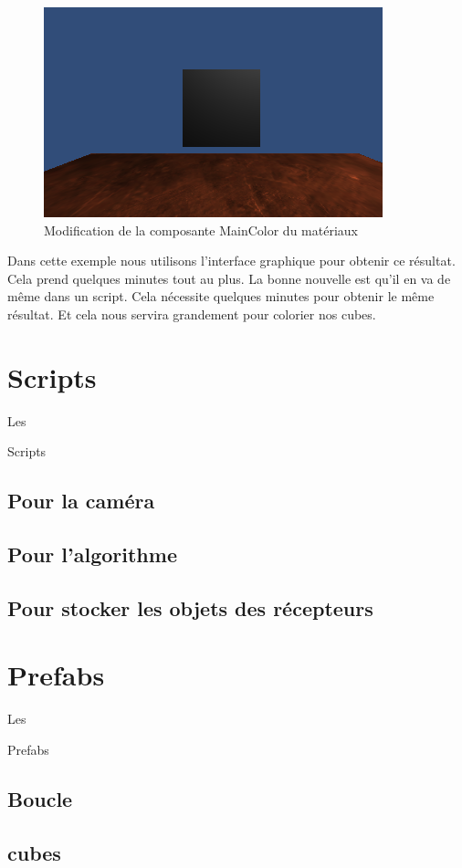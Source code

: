 \documentclass[a4paper,11pt]{myreport}
\begin{document}
	\begin{figure}[h]
	\includegraphics[scale=0.40]{./images/materiaux_cuivre.png}
	\caption{Modification de la composante MainColor du matériaux}
	\end{figure}
	\par Dans cette exemple nous utilisons l'interface graphique pour obtenir ce résultat. Cela prend quelques minutes tout au plus. La bonne nouvelle est qu'il en va de même dans un script. Cela nécessite quelques minutes pour obtenir le même résultat. Et cela nous servira grandement pour colorier nos cubes.
	\section{Scripts}
	\hypertarget{scriptTarget}{Les} Scripts
	\subsection{Pour la caméra}
	\subsection{Pour l'algorithme}
	\subsection{Pour stocker les objets des récepteurs}
	\section{Prefabs}
	\hypertarget{prefabTarget}{Les} Prefabs
	\subsection{Boucle}
	\subsection{cubes}
\end{document}
